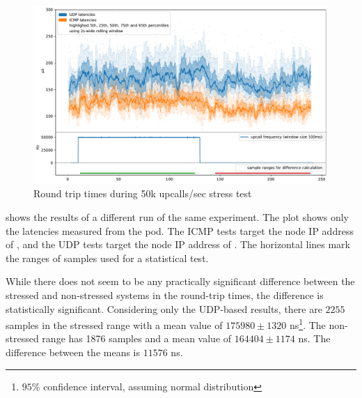 \begin{figure}
    \centering
    \includegraphics[width=.9\linewidth]{img/packet_flood_50k_latency.pdf}
    \caption{Round trip times during 50k upcalls/sec stress test}
    \label{fig:plot-packet-flood-50k-latency}
\end{figure}

 shows the results of a different run of the same experiment. The plot shows only the latencies measured from the  pod. The ICMP tests target the node IP address of , and the UDP tests target the node IP address of . The horizontal lines mark the ranges of samples used for a statistical test.

While there does not seem to be any practically significant difference between the stressed and non-stressed systems in the round-trip times, the difference is statistically significant. Considering only the UDP-based results, there are $2255$ samples in the stressed range with a mean value of $175980 \pm 1320$ \si{\nano\second}\footnote{$95\%$ confidence interval, assuming normal distribution}. The non-stressed range has 1876 samples and a mean value of $164404 \pm 1174$ \si{\nano\second}. The difference between the means is $11576$ \si{\nano\second}.

